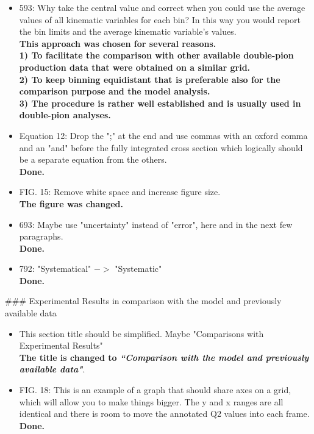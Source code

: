 \documentclass[,superscriptaddress,showpacs,amssymb,amsmath,amsfonts,linenumbers,article]{revtex4-1}
\begin{document}
\begin{itemize}
\item 593: Why take the central value and correct when you could use the average values of all kinematic variables for each bin? In this way you would report the bin limits and the average kinematic variable's values.\\
{\bf 
This approach was chosen for several reasons. \\
1) To facilitate the comparison with other available double-pion production data that were obtained on a similar grid.\\
2) To keep binning equidistant that is preferable also for the comparison purpose and the model analysis.\\
3) The procedure is rather well established and is usually used in double-pion analyses.
}

\item Equation 12: Drop the ";" at the end and use commas with an oxford comma and an "and" before the fully integrated cross section which logically should be a separate equation from the others.\\
{\bf Done.}

\item FIG. 15: Remove white space and increase figure size.\\
{\bf The figure was changed.}

\item 693: Maybe use "uncertainty" instead of "error", here and in the next few paragraphs.\\
{\bf Done.}

\item 792: "Systematical" $->$ "Systematic"\\[0.5cm]
{\bf Done.}

\end{itemize}


\#\#\# Experimental Results in comparison with the model and previously available data\\[0.5cm]

\begin{itemize}

\item This section title should be simplified. Maybe "Comparisons with Experimental Results"\\
{\bf The title is changed to \textbf{\textit{``Comparison with the model and previously available data"}}}.

\item FIG. 18: This is an example of a graph that should share axes on a grid, which will allow you to make things bigger. The y and x ranges are all identical and there is room to move the annotated Q2 values into each frame.\\[0.5cm]
{\bf Done.}

\end{itemize}
\end{document}

